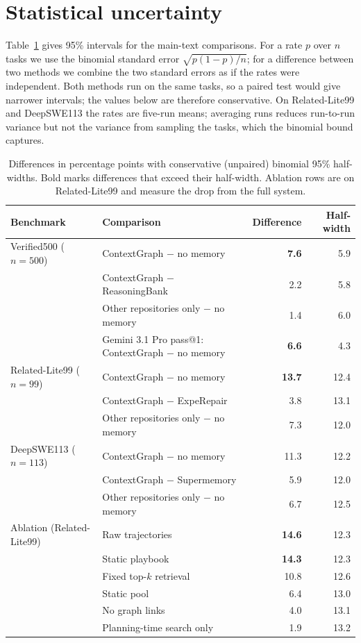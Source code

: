 \section{Statistical uncertainty}
\label{sec:uncertainty}
Table~\ref{tab:uncertainty} gives 95\% intervals for the main-text
comparisons. For a rate $p$ over $n$ tasks we use the binomial standard error
$\sqrt{p(1-p)/n}$; for a difference between two methods we combine the two
standard errors as if the rates were independent. Both methods run on the same
tasks, so a paired test would give narrower intervals; the values below are
therefore conservative. On Related-Lite99 and DeepSWE113 the rates are
five-run means; averaging runs reduces run-to-run variance but not the
variance from sampling the tasks, which the binomial bound captures.

\begin{table}[htbp]
\centering
\caption{Differences in percentage points with conservative (unpaired)
binomial 95\% half-widths. Bold marks differences that exceed their
half-width. Ablation rows are on Related-Lite99 and measure the drop from the
full system.}
\label{tab:uncertainty}
\small
\setlength{\tabcolsep}{4pt}
\begin{tabular}{@{}llrr@{}}
\toprule
Benchmark & Comparison & Difference & Half-width \\
\midrule
Verified500 ($n{=}500$) & ContextGraph $-$ no memory & \textbf{7.6} & 5.9 \\
 & ContextGraph $-$ ReasoningBank & 2.2 & 5.8 \\
 & Other repositories only $-$ no memory & 1.4 & 6.0 \\
 & Gemini 3.1 Pro pass@1: ContextGraph $-$ no memory & \textbf{6.6} & 4.3 \\
\midrule
Related-Lite99 ($n{=}99$) & ContextGraph $-$ no memory & \textbf{13.7} & 12.4 \\
 & ContextGraph $-$ ExpeRepair & 3.8 & 13.1 \\
 & Other repositories only $-$ no memory & 7.3 & 12.0 \\
\midrule
DeepSWE113 ($n{=}113$) & ContextGraph $-$ no memory & 11.3 & 12.2 \\
 & ContextGraph $-$ Supermemory & 5.9 & 12.0 \\
 & Other repositories only $-$ no memory & 6.7 & 12.5 \\
\midrule
Ablation (Related-Lite99) & Raw trajectories & \textbf{14.6} & 12.3 \\
 & Static playbook & \textbf{14.3} & 12.3 \\
 & Fixed top-$k$ retrieval & 10.8 & 12.6 \\
 & Static pool & 6.4 & 13.0 \\
 & No graph links & 4.0 & 13.1 \\
 & Planning-time search only & 1.9 & 13.2 \\
\bottomrule
\end{tabular}
\end{table}
